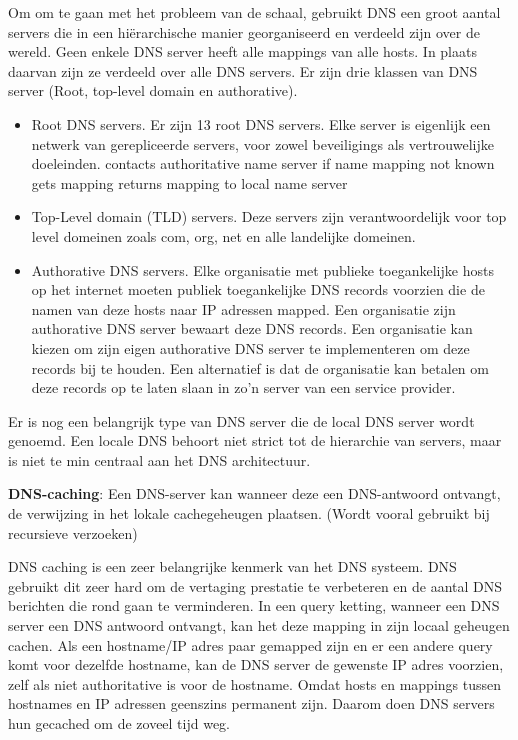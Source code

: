 \clearpage


Om om te gaan met het probleem van de schaal, gebruikt DNS een groot aantal servers die in een hiërarchische manier georganiseerd en verdeeld zijn over de wereld. Geen enkele DNS server heeft alle mappings van alle hosts. In plaats daarvan zijn ze verdeeld over alle DNS servers. Er zijn drie klassen van DNS server (Root, top-level domain en authorative).

\begin{itemize}
    \item Root DNS servers. Er zijn 13 root DNS servers. Elke server is eigenlijk een netwerk van gerepliceerde servers, voor zowel beveiligings als vertrouwelijke doeleinden.
    \bi
    \itf contacts authoritative name server if name mapping not known
    \itf gets mapping
    \itf returns mapping to local name server
    \ei
\item Top-Level domain (TLD) servers. Deze servers zijn verantwoordelijk voor top level domeinen zoals com, org, net en alle landelijke domeinen.
\item Authorative DNS servers. Elke organisatie met publieke toegankelijke hosts op het internet moeten publiek toegankelijke DNS records voorzien die de namen van deze hosts naar IP adressen mapped. Een organisatie zijn authorative DNS server bewaart deze DNS records. Een organisatie kan kiezen om zijn eigen authorative DNS server te implementeren om deze records bij te houden. Een alternatief is dat de organisatie kan betalen om deze records op te laten slaan in zo’n server van een service provider.
\end{itemize}

Er is nog een belangrijk type van DNS server die de local DNS server wordt genoemd. Een locale DNS behoort niet strict tot de hierarchie van servers, maar is niet te min centraal aan het DNS architectuur. 


\textbf{DNS-caching}: Een DNS-server kan wanneer deze een DNS-antwoord ontvangt, de verwijzing in het lokale cachegeheugen plaatsen. (Wordt vooral gebruikt bij recursieve verzoeken)

\noindent DNS caching is een zeer belangrijke kenmerk van het DNS systeem. DNS gebruikt dit zeer hard om de vertaging prestatie te verbeteren en de aantal DNS berichten die rond gaan te verminderen. In een query ketting, wanneer een DNS server een DNS antwoord ontvangt, kan het deze mapping in zijn locaal geheugen cachen. Als een hostname/IP adres paar gemapped zijn en er een andere query komt voor dezelfde hostname, kan de DNS server de gewenste IP adres voorzien, zelf als niet authoritative is voor de hostname. Omdat hosts en mappings tussen hostnames en IP adressen geenszins permanent zijn. Daarom doen DNS servers hun gecached om de zoveel tijd weg.

